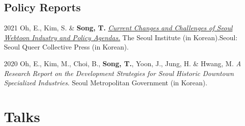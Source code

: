 \documentclass[12pt,letterpaper]{report}
\begin{document}
    \subsection*{Policy Reports}
    \begin{tablist}
        \item[2021] \tab{}Oh, E., Kim, S. \& \textbf{Song, T.} \emph{\href{http://global.si.re.kr/content/current-changes-and-challenges-seoul-webtoon-industry-and-policy-agendas}{Current Changes and Challenges of Seoul Webtoon Industry and Policy Agendas.}} The Seoul Institute (in Korean).Seoul: Seoul Queer Collective Press (in Korean).
        \item[2020] \tab{}Oh, E., Kim, M., Choi, B., \textbf{Song, T.}, Yoon, J., Jung, H. \& Hwang, M. \emph{A Research Report on the Development Strategies for Seoul Historic Downtown Specialized Industries.} Seoul Metropolitan Government (in Korean).
    \end{tablist}
    
    \section*{Talks}
\end{document}
